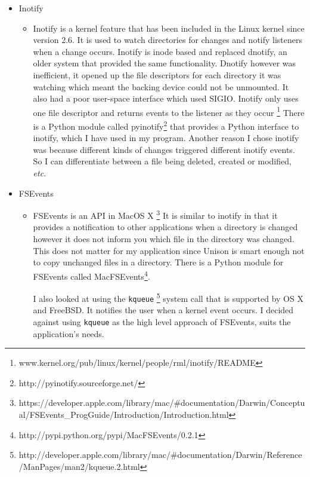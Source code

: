 \documentclass[12pt]{article}
\begin{document}
\begin{itemize}
    \item Inotify
        \begin{itemize}
        \item Inotify is a kernel feature that has been
        included in the Linux kernel since version 2.6.
        It is used to watch directories for changes
        and notify listeners when a change occurs. Inotify
        is inode based and replaced dnotify, an older system
        that provided the same functionality. Dnotify however was
        inefficient, it opened up the file descriptors for
        each directory it was watching which meant the backing
        device could not be unmounted. 
        It also had a poor
        user-space interface which used SIGIO. Inotify only
        uses one file descriptor and returns events to the
        listener as they occur
        \footnote{www.kernel.org/pub/linux/kernel/people/rml/inotify/README}
        There is a Python module
        called pyinotify\footnote{http://pyinotify.sourceforge.net/}
        that provides a Python interface
        to inotify, which I have used in my program.
        Another reason I chose inotify was because different kinds
        of changes triggered different inotify events. So I
        can differentiate between a file being deleted, created
        or modified, \emph{etc}.
        \end{itemize}

    \item FSEvents
        \begin{itemize}
        \item FSEvents is an API in MacOS X
        \footnote{https://developer.apple.com/library/mac/\#documentation/Darwin/Conceptual/FSEvents\_ProgGuide/Introduction/Introduction.html}
        It is similar
        to inotify in that it provides a notification to other
        applications when a directory is changed however
        it does not inform you which file in the directory
        was changed. This does not matter for my
        application since Unison is smart enough not to copy
        unchanged files in a directory. There is a Python module
        for FSEvents called MacFSEvents\footnote{http://pypi.python.org/pypi/MacFSEvents/0.2.1}. 
        
        I also looked at using the \texttt{kqueue}
        \footnote{http://developer.apple.com/library/mac/\#documentation/Darwin/Reference/ManPages/man2/kqueue.2.html}
        system call that is
        supported by OS X and FreeBSD. It notifies the user
        when a kernel event occurs. I decided against using
        \texttt{kqueue} as the high level approach of FSEvents,
        suits the application's needs.
        \end{itemize}


\end{itemize}
\end{document}
